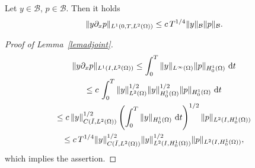 \begin{lemma}\label{lemadjoint}
  Let $y\in\mathcal B$, $p\in\mathcal B$. Then it holds
\[
\lVert y\partial_x p\rVert_{L^1(0,T,L^2(\Omega))} \leq c\,T^{1/4}\lVert y\rVert_{\mathcal{B}}\lVert p\rVert_{\mathcal{B}}.
\]
\end{lemma}
\begin{proof}[Proof of Lemma~\ref{lemadjoint}]
\begin{multline*}
\lVert y\partial_x p\rVert_{L^1(I,L^2(\Omega))}\leq \int_0^T{\lVert y\rVert_{L^{\infty}(\Omega)}\lVert p\rVert_{H^1_0(\Omega)}}~\mathrm dt\\
\leq c\,\int_0^T{\lVert y\rVert_{L^2(\Omega)}^{1/2}\lVert y\rVert_{H^1_0(\Omega)}^{1/2}\lVert p\rVert_{H^1_0(\Omega)}}~\mathrm dt\\
\leq c\,\lVert y\rVert_{C(\bar I,L^2(\Omega))}^{1/2}\left( \int_0^T{\lVert y\rVert_{H^1_0(\Omega)}}~\mathrm dt\right)^{1/2}\lVert p\rVert_{L^2(I,H^1_0(\Omega))}\\
\leq c\, T^{1/4} \lVert y\rVert_{C(\bar I,L^2(\Omega))}^{1/2} \lVert y\rVert_{L^2(I,H^1_0(\Omega))}^{1/2}\lVert p\rVert_{L^2(I,H^1_0(\Omega))},
\end{multline*}
which implies the assertion.
\qquad\end{proof}





